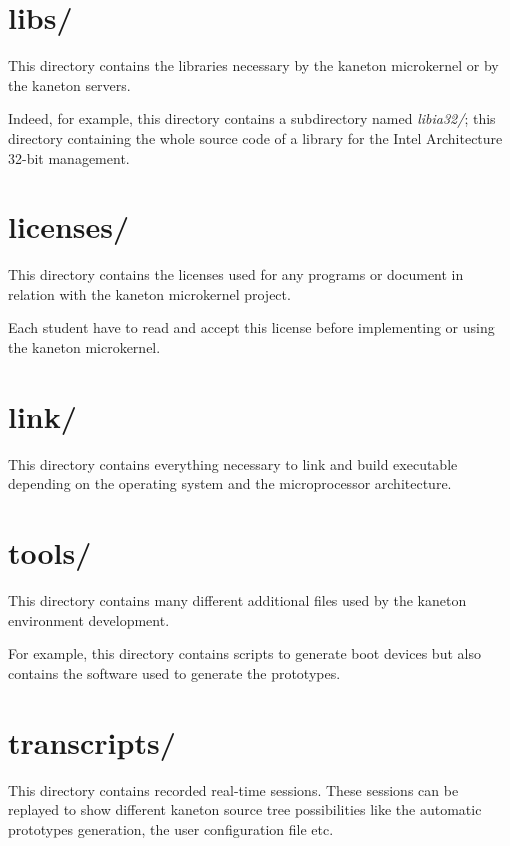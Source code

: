 %
%

\section{libs/}

This directory contains the libraries necessary by the kaneton microkernel
or by the kaneton servers.

Indeed, for example, this directory contains a subdirectory named
\textit{libia32/}; this directory containing the whole source code of
a library for the Intel Architecture 32-bit management.

%
%

\section{licenses/}

This directory contains the licenses used for any programs or document
in relation with the kaneton microkernel project.

Each student have to read and accept this license before implementing
or using the kaneton microkernel.

%
%

\section{link/}

This directory contains everything necessary to link and build
executable depending on the operating system and the microprocessor
architecture.

%
%

\section{tools/}

This directory contains many different additional files used by
the kaneton environment development.

For example, this directory contains scripts to generate boot devices
but also contains the software used to generate the prototypes.

%
%

\section{transcripts/}

This directory contains recorded real-time sessions. These sessions
can be replayed to show different kaneton source tree possibilities
like the automatic prototypes generation, the user configuration file
etc.

